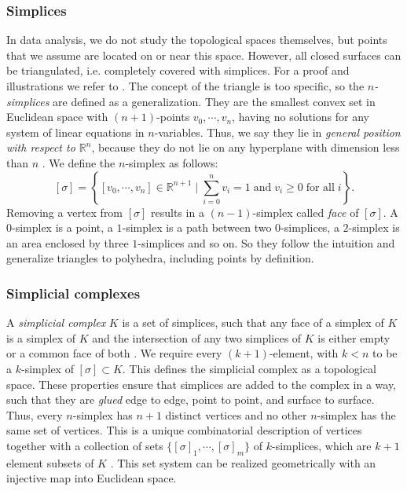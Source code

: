 \documentclass[runningheads,orivec]{llncs}
\begin{document}
\subsubsection{Simplices} In data analysis, we do not study the topological spaces themselves, but points that we assume are located on or near this space. However, all closed surfaces can be triangulated, i.e. completely covered with simplices. For a proof and illustrations we refer to \cite[p.~102]{hatcher2002algebraic,lume}. The concept of the triangle is too specific, so the \emph{$n$-simplices} are defined as a generalization. They are the smallest convex set in Euclidean space with $(n+1)$-points $v_0,\cdots,v_n$, having no solutions for any system of linear equations in $n$-variables. Thus, we say they lie in \emph{general position with respect to $\mathbb{R}^n$}, because they do not lie on any hyperplane with dimension less than $n$ \cite[p.~103]{hatcher2002algebraic}. We define the $n$-simplex as follows:
\begin{equation}
    \label{simplex}
    [\sigma] = \left\{ [v_0,\cdots,v_n] \in \mathbb{R}^{n+1} \; \bigg\vert \; \sum_{i=0}^{n} v_i = 1 \; \text{and} \; v_i \geq 0 \; \text{for all} \; i \right\}.
\end{equation}
Removing a vertex from $[\sigma]$ results in a $(n-1)$-simplex called \emph{face} of $[\sigma]$. A $0$-simplex is a point, a $1$-simplex is a path between two $0$-simplices, a $2$-simplex is an area enclosed by three $1$-simplices and so on. So they follow the intuition and generalize triangles to polyhedra, including points by definition.


\subsubsection{Simplicial complexes} A \emph{simplicial complex} $K$ is a set of simplices, such that any face of a simplex of $K$ is a simplex of $K$ and the intersection of any two simplices of $K$ is either empty or a common face of both \cite[p.~11]{boissonnat2018geometric}. We require every $(k+1)$-element, with $k < n$ to be a $k$-simplex of $[\sigma] \subset K$. This defines the simplicial complex as a topological space. These properties ensure that simplices are added to the complex in a way, such that they are \emph{glued} edge to edge, point to point, and surface to surface. Thus, every $n$-simplex has $n+1$ distinct vertices and no other $n$-simplex has the same set of vertices. This is a unique combinatorial description of vertices together with a collection of sets $\{[\sigma]_1, \cdots, [\sigma]_m\}$ of $k$-simplices, which are $k+1$ element subsets of $K$ \cite[p.~107]{hatcher2002algebraic}. This set system can be realized geometrically with an injective map into Euclidean space.
\end{document}
